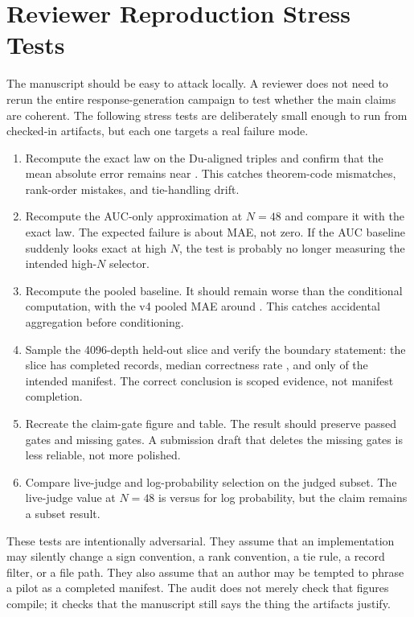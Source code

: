 \section{Reviewer Reproduction Stress Tests}
\label{app:stress-tests}

The manuscript should be easy to attack locally. A reviewer does not need to
rerun the entire response-generation campaign to test whether the main claims
are coherent. The following stress tests are deliberately small enough to run
from checked-in artifacts, but each one targets a real failure mode.

\begin{enumerate}
\item Recompute the exact law on the Du-aligned triples and confirm that the
mean absolute error remains near \EvidenceCoreMAE{}. This catches theorem-code
mismatches, rank-order mistakes, and tie-handling drift.
\item Recompute the AUC-only approximation at $N=48$ and compare it with the
exact law. The expected failure is about \EvidenceAucNFortyEightMAE{} MAE, not
zero. If the AUC baseline suddenly looks exact at high $N$, the test is
probably no longer measuring the intended high-$N$ selector.
\item Recompute the pooled baseline. It should remain worse than the
conditional computation, with the v4 pooled MAE around \EvidencePooledMAE{}.
This catches accidental aggregation before conditioning.
\item Sample the 4096-depth held-out slice and verify the boundary statement:
the slice has \EvidenceHeldoutRecords{} completed records, median correctness
rate \EvidenceHeldoutPMedian{}, and only
\EvidenceHeldoutCoveragePct{} of the intended manifest. The correct conclusion
is scoped evidence, not manifest completion.
\item Recreate the claim-gate figure and table. The result should preserve
\EvidenceGatePass{} passed gates and \EvidenceGateMissing{} missing gates. A
submission draft that deletes the missing gates is less reliable, not more
polished.
\item Compare live-judge and log-probability selection on the judged subset.
The live-judge value at $N=48$ is \EvidenceLiveJudgeNFortyEight{} versus
\EvidenceLogprobNFortyEight{} for log probability, but the claim remains a
subset result.
\end{enumerate}

These tests are intentionally adversarial. They assume that an implementation
may silently change a sign convention, a rank convention, a tie rule, a record
filter, or a file path. They also assume that an author may be tempted to
phrase a pilot as a completed manifest. The audit does not merely check that
figures compile; it checks that the manuscript still says the thing the
artifacts justify.

